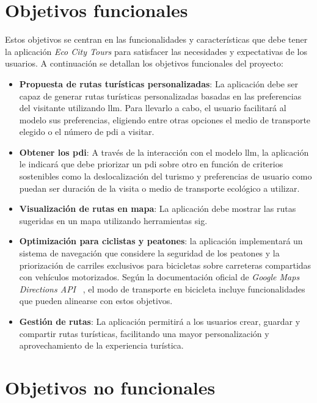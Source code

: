 
\section{Objetivos funcionales}

Estos objetivos se centran en las funcionalidades y características que debe tener la aplicación \textit{Eco City Tours} para satisfacer las necesidades y expectativas de los usuarios. A continuación se detallan los objetivos funcionales del proyecto:

\begin{itemize}
    \item \textbf{Propuesta de rutas turísticas personalizadas}: La aplicación debe ser capaz de generar rutas turísticas personalizadas basadas en las preferencias del visitante utilizando \acrfull{llm}. Para llevarlo a cabo, el usuario facilitará al modelo sus preferencias, eligiendo entre otras opciones el medio de transporte elegido o el número de \acrfull{pdi} a visitar.
    \item \textbf{Obtener los \acrfull{pdi}}: A través de la interacción con el modelo \acrshort{llm}, la aplicación le indicará que debe priorizar un \acrshort{pdi} sobre otro en función de criterios sostenibles como la deslocalización del turismo y preferencias de usuario como puedan ser duración de la visita o medio de transporte ecológico a utilizar.
    \item \textbf{Visualización de rutas en mapa}: La aplicación debe mostrar las rutas sugeridas en un mapa utilizando herramientas \acrshort{sig}.
    \item \textbf{Optimización para ciclistas y peatones}: la aplicación implementará un sistema de navegación que considere la seguridad de los peatones y la priorización de carriles exclusivos para bicicletas sobre carreteras compartidas con vehículos motorizados. Según la documentación oficial de \textit{Google Maps Directions API }~\cite{google_directions}, el modo de transporte en bicicleta incluye funcionalidades que pueden alinearse con estos objetivos.
    \item \textbf{Gestión de rutas}: La aplicación permitirá a los usuarios crear, guardar y compartir rutas turísticas, facilitando una mayor personalización y aprovechamiento de la experiencia turística.
    

\end{itemize}

\section{Objetivos no funcionales}

